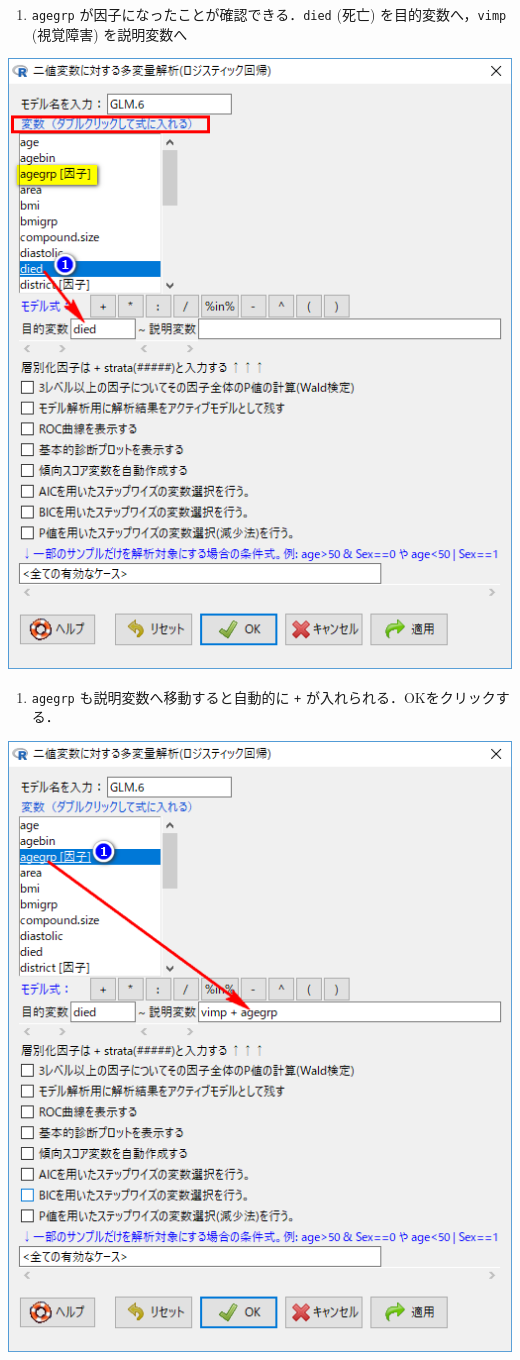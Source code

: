 \documentclass[11pt,]{problemset}
\providecommand{\tightlist}{%
  \setlength{\itemsep}{0pt}\setlength{\parskip}{0pt}}
\begin{document}
\begin{enumerate}
\def\labelenumi{\arabic{enumi}.}
\setcounter{enumi}{1}
\tightlist
\item
  \texttt{agegrp} が因子になったことが確認できる．\newline \texttt{died}
  (死亡) を目的変数へ，\texttt{vimp} (視覚障害) を説明変数へ
\end{enumerate}

\begin{center}\includegraphics[width=0.5\linewidth,height=0.5\textheight]{pic/mltlogstic05} \end{center}

\begin{enumerate}
\def\labelenumi{\arabic{enumi}.}
\setcounter{enumi}{2}
\tightlist
\item
  \texttt{agegrp} も説明変数へ移動すると自動的に \texttt{+}
  が入れられる．OKをクリックする．
\end{enumerate}

\begin{center}\includegraphics[width=0.5\linewidth,height=0.5\textheight]{pic/mltlogstic06} \end{center}
\end{document}
